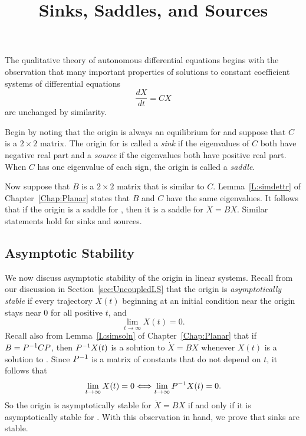 \documentclass{ximera}
\title{Sinks, Saddles, and Sources}
\begin{document}
\begin{abstract}
\end{abstract}
\maketitle

 \label{S:6.7}

The qualitative theory of autonomous differential equations begins with
the observation that many important properties of solutions to constant
coefficient systems of differential equations
\begin{equation} \label{e:C2}
\frac{dX}{dt}=CX
\end{equation}
are unchanged by similarity.

Begin by noting that the origin is always an equilibrium for 
and suppose that $C$ is a $2\times 2$ matrix.  The origin for 
is called a {\em sink\/} if the eigenvalues of $C$ both have
negative real
part and a {\em source\/} if the eigenvalues both have
positive real part.
When $C$ has one eigenvalue of each sign, the origin is called a
{\em saddle}.

Now suppose that $B$ is a $2\times 2$ matrix that is similar to $C$.
Lemma~\ref{L:simdettr} of Chapter~\ref{Chap:Planar} states that $B$ and
$C$ have the same eigenvalues.  It follows that if the origin is a saddle
for , then it is a saddle for $\dot{X}=BX$.  Similar statements
hold for sinks and sources.

\subsection*{Asymptotic Stability}

We now discuss asymptotic stability of the origin in linear systems.
Recall from our discussion in Section~\ref{sec:UncoupledLS} 
that the origin is {\em asymptotically stable\/} 
if every trajectory $X(t)$ beginning at an initial condition near the
origin stays near $0$ for all positive $t$, and
\[
\lim_{t\to\infty}X(t) = 0.
\]
Recall also from Lemma~\ref{L:simsoln} of Chapter~\ref{Chap:Planar} that
if $B=P^{-1} CP$, then $P^{-1} X(t)$ is a solution to $\dot{X}=BX$ whenever
$X(t)$ is a solution to .  Since $P^{-1}$ is a matrix of constants
that do not depend on $t$, it follows that
\[
\lim_{t\to\infty}X(t) = 0 \Longleftrightarrow \lim_{t\to\infty}P^{-1} X(t) = 0.
\]
So the origin is asymptotically stable for $\dot{X}=BX$ if and only if it is
asymptotically stable for .  With this observation in hand, we
prove that sinks are stable.
\end{document}
